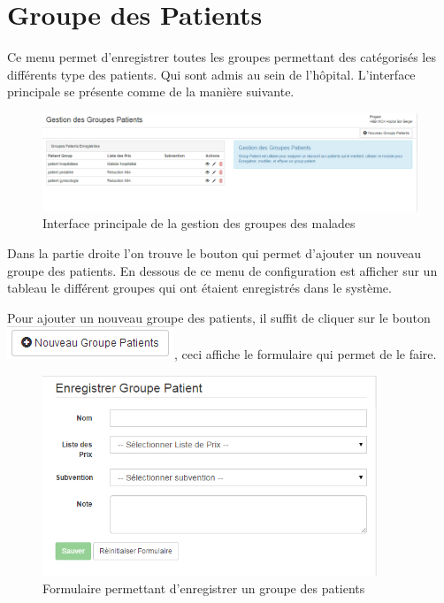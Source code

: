\documentclass[12pt,a4paper]{report}
\begin{document}
\newpage
\section{Groupe des Patients}
Ce menu permet d'enregistrer toutes les groupes permettant des catégorisés les différents type des patients. Qui sont admis au sein de l'hôpital. 
L'interface principale se présente comme de la manière suivante.

\begin{figure}[h]
\begin{center}
\includegraphics[width=16cm]{pic/AdminGroupPatient.png}
\end{center}
\caption{Interface principale de la gestion des groupes des malades}
\label{Interface principale de la gestion des groupes des malades}
\end{figure}

Dans la partie droite l'on trouve le bouton qui permet d'ajouter un nouveau groupe des patients. En dessous de ce menu de configuration est afficher sur un tableau le différent groupes qui ont étaient enregistrés dans le système. 

Pour ajouter un nouveau groupe des patients, il suffit de cliquer sur le bouton \includegraphics[scale=0.7]{pic/NewGroupPatient.png}, ceci affiche le formulaire qui permet de le faire.

\begin{figure}[h]
\begin{center}
\includegraphics[width=10cm]{pic/FormGroupPatient.png}
\end{center}
\caption{Formulaire permettant d'enregistrer un groupe des patients}
\label{Formulaire permettant d'enregistrer un groupe des patients}
\end{figure}
\end{document}
